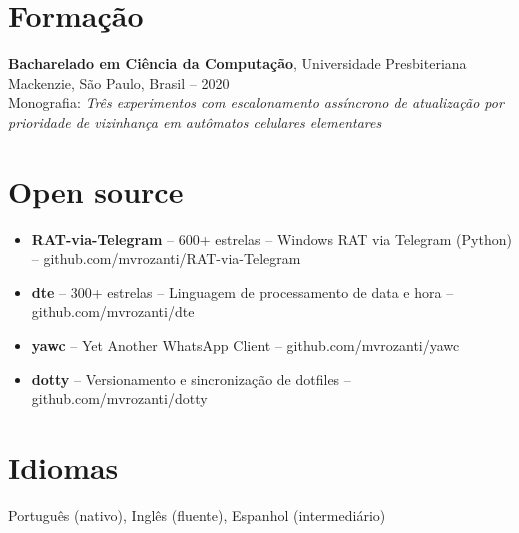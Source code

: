 \documentclass[10pt,a4paper]{article}
\begin{document}
\section{Formação}
\noindent\textbf{Bacharelado em Ciência da Computação}, Universidade Presbiteriana Mackenzie, São Paulo, Brasil -- 2020\\
Monografia: \textit{Três experimentos com escalonamento assíncrono de atualização por prioridade de vizinhança em autômatos celulares elementares}

\section{Open source}
\begin{itemize}
\item \textbf{RAT-via-Telegram} -- 600+ estrelas -- Windows RAT via Telegram (Python) -- github.com/mvrozanti/RAT-via-Telegram
\item \textbf{dte} -- 300+ estrelas -- Linguagem de processamento de data e hora -- github.com/mvrozanti/dte
\item \textbf{yawc} -- Yet Another WhatsApp Client -- github.com/mvrozanti/yawc
\item \textbf{dotty} -- Versionamento e sincronização de dotfiles -- github.com/mvrozanti/dotty
\end{itemize}

\section{Idiomas}
Português (nativo), Inglês (fluente), Espanhol (intermediário)
\end{document}
